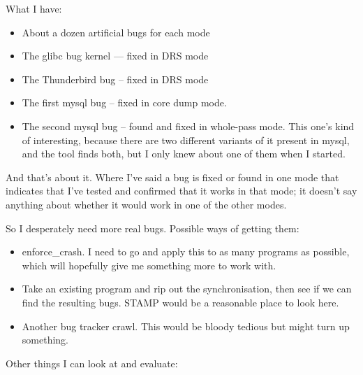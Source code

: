 What I have:

\begin{itemize}
\item About a dozen artificial bugs for each mode
\item The glibc bug kernel --- fixed in DRS mode
\item The Thunderbird bug -- fixed in DRS mode
\item The first mysql bug -- fixed in core dump mode.
\item The second mysql bug -- found and fixed in whole-pass mode.
  This one's kind of interesting, because there are two different
  variants of it present in mysql, and the tool finds both, but I only
  knew about one of them when I started.
\end{itemize}

And that's about it.
Where I've said a bug is fixed or found in one mode that indicates that I've tested and confirmed that it works in that mode; it doesn't say anything about whether it would work in one of the other modes.

So I desperately need more real bugs.
Possible ways of getting them:

\begin{itemize}
\item
  enforce\_crash.
  I need to go and apply this to as many programs as possible, which will hopefully give me something more to work with.
\item
  Take an existing program and rip out the synchronisation, then see if we can find the resulting bugs.
  STAMP would be a reasonable place to look here.
\item
  Another bug tracker crawl.
  This would be bloody tedious but might turn up something.
\end{itemize}

Other things I can look at and evaluate:

